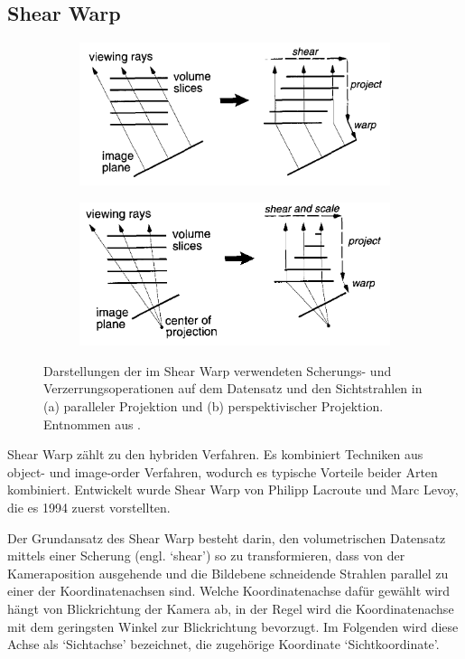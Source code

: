 \documentclass[a4paper,fontsize=12pt,toc=bib,halfparskip,ngerman]{scrartcl}
\begin{document}
\subsection{Shear Warp}
\begin{figure}
	\centering
	\begin{subfigure}{0.49\textwidth}
		\includegraphics[width=\textwidth]{pictures/ShearWarp1}
		\caption{}
		\label{ShearWarp1}
	\end{subfigure}
	\hfill
	\begin{subfigure}{0.49\textwidth}
		\includegraphics[width=\textwidth]{pictures/ShearWarp2}
		\caption{}
		\label{ShearWarp2}
	\end{subfigure}
	\caption{Darstellungen der im Shear Warp verwendeten Scherungs- und Verzerrungsoperationen auf dem Datensatz und den Sichtstrahlen in (a) paralleler Projektion und (b) perspektivischer Projektion. Entnommen aus \cite{lacroute1994fast}.}
\end{figure}
Shear Warp z\"ahlt zu den hybriden Verfahren. Es kombiniert Techniken aus object- und image-order Verfahren, wodurch es typische Vorteile beider Arten kombiniert. Entwickelt wurde Shear Warp von Philipp Lacroute und Marc Levoy, die es 1994 zuerst vorstellten\cite{lacroute1994fast}. 

Der Grundansatz des Shear Warp besteht darin, den volumetrischen Datensatz mittels einer Scherung (engl. `shear') so zu transformieren, dass von der Kameraposition ausgehende und die Bildebene schneidende Strahlen parallel zu einer der Koordinatenachsen sind. Welche Koordinatenachse daf\"ur gew\"ahlt wird h\"angt von Blickrichtung der Kamera ab, in der Regel wird die Koordinatenachse mit dem geringsten Winkel zur Blickrichtung bevorzugt. Im Folgenden wird diese Achse als `Sichtachse' bezeichnet, die zugeh\"orige Koordinate `Sichtkoordinate'. 
\end{document}
